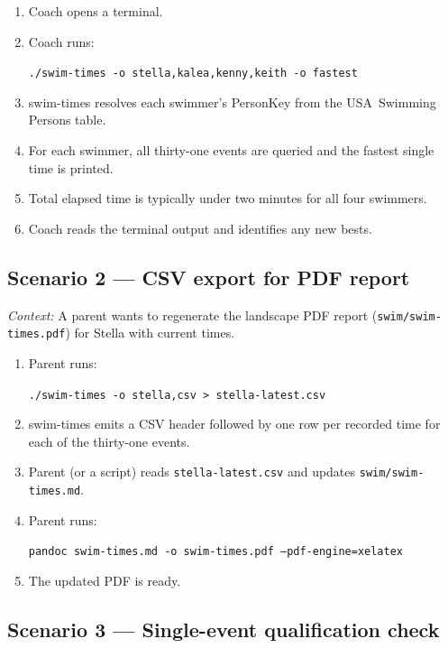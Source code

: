\documentclass[12pt]{article}
\newcommand{\code}[1]{\texttt{#1}}
\begin{document}
\begin{enumerate}
  \item Coach opens a terminal.
  \item Coach runs:
        \begin{center}
          \code{./swim-times -o stella,kalea,kenny,keith -o fastest}
        \end{center}
  \item swim-times resolves each swimmer's PersonKey from the
        USA~Swimming Persons table.
  \item For each swimmer, all thirty-one events are queried and
        the fastest single time is printed.
  \item Total elapsed time is typically under two minutes for all
        four swimmers.
  \item Coach reads the terminal output and identifies any new bests.
\end{enumerate}

\subsection{Scenario 2 --- CSV export for PDF report}

\textit{Context:} A parent wants to regenerate the landscape PDF
report (\code{swim/swim-times.pdf}) for Stella with current times.

\begin{enumerate}
  \item Parent runs:
        \begin{center}
          \code{./swim-times -o stella,csv > stella-latest.csv}
        \end{center}
  \item swim-times emits a CSV header followed by one row per
        recorded time for each of the thirty-one events.
  \item Parent (or a script) reads \code{stella-latest.csv}
        and updates \code{swim/swim-times.md}.
  \item Parent runs:
        \begin{center}
          \code{pandoc swim-times.md -o swim-times.pdf
                --pdf-engine=xelatex}
        \end{center}
  \item The updated PDF is ready.
\end{enumerate}

\subsection{Scenario 3 --- Single-event qualification check}
\end{document}
